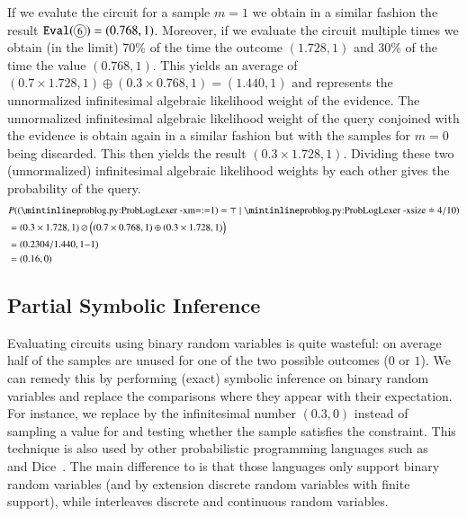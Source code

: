 \begin{example}
If we evalute the circuit for a sample $m=1$ we obtain in a similar fashion the result $\mathtt{Eval}(\footcircled{$6$})= (0.768,1)$. Moreover, if we evaluate the circuit multiple times we obtain (in the limit) 70\% of the time the outcome $(1.728,1)$ and 30\% of the time the value $(0.768,1)$. This yields an average of $(0.7\times 1.728, 1)\oplus (0.3\times 0.768, 1)= (1.440,1)$ and represents the unnormalized infinitesimal algebraic likelihood weight of the evidence.
The unnormalized infinitesimal algebraic likelihood weight of the query conjoined with the evidence is obtain again in a similar fashion but with the samples for $m=0$ being discarded. This then yields the result $(0.3\times 1.728, 1)$.
Dividing these two (unnormalized) infinitesimal algebraic likelihood weights by each other gives the probability of the query.
\begin{align*}
    &P((\mathprobloginline{m=:=1}) =\top \mid \mathprobloginline{size}\doteq 4/10 )\\
    &=(0.3\times 1.728, 1) \oslash \Big( (0.7\times 0.768,1 ) \oplus (0.3\times 1.728,1) \Big) \\
    &= (0.2304/1.440 , 1{-}1) \\
    &= (0.16,0)
\end{align*}
\end{example}



\subsection{Partial Symbolic Inference}

Evaluating circuits using binary random variables is quite wasteful: on average half of the samples are unused for one of the two possible outcomes ($0$ or $1$). We can remedy this by performing (exact) symbolic inference on binary random variables and replace the comparisons where they appear with their expectation. For instance, we replace  by the infinitesimal number $(0.3,0)$ instead of sampling a value for  and testing whether the sample satisfies the constraint. This technique is also used by other probabilistic programming languages such as \problogsty~\citep{fierens2015inference} and Dice~\citep{holtzen2020dice}. The main difference to \dcproblogsty is that those languages only support binary random variables (and by extension discrete random variables with finite support), while \dcproblogsty interleaves discrete and continuous random variables.

